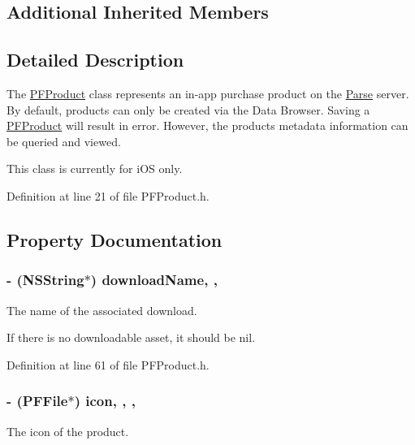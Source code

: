 \subsection*{Additional Inherited Members}


\subsection{Detailed Description}
The {\ttfamily \hyperlink{interface_p_f_product}{P\+F\+Product}} class represents an in-\/app purchase product on the \hyperlink{interface_parse}{Parse} server. By default, products can only be created via the Data Browser. Saving a {\ttfamily \hyperlink{interface_p_f_product}{P\+F\+Product}} will result in error. However, the products\textquotesingle{} metadata information can be queried and viewed.

This class is currently for i\+O\+S only. 

Definition at line 21 of file P\+F\+Product.\+h.



\subsection{Property Documentation}
\hypertarget{interface_p_f_product_a1462cf0bd4dffe98775e3439208ec238}{}
\subsubsection[{download\+Name}]{\setlength{\rightskip}{0pt plus 5cm}-\/ (N\+S\+String$\ast$) download\+Name\hspace{0.3cm}{\ttfamily [read]}, {\ttfamily [nonatomic]}, {\ttfamily [strong]}}\label{interface_p_f_product_a1462cf0bd4dffe98775e3439208ec238}
The name of the associated download.

If there is no downloadable asset, it should be {\ttfamily nil}. 

Definition at line 61 of file P\+F\+Product.\+h.

\hypertarget{interface_p_f_product_a23132bc0aeaa67fa7d7e49b477818477}{}
\subsubsection[{icon}]{\setlength{\rightskip}{0pt plus 5cm}-\/ ({\bf P\+F\+File}$\ast$) icon\hspace{0.3cm}{\ttfamily [read]}, {\ttfamily [write]}, {\ttfamily [nonatomic]}, {\ttfamily [strong]}}\label{interface_p_f_product_a23132bc0aeaa67fa7d7e49b477818477}
The icon of the product. 

